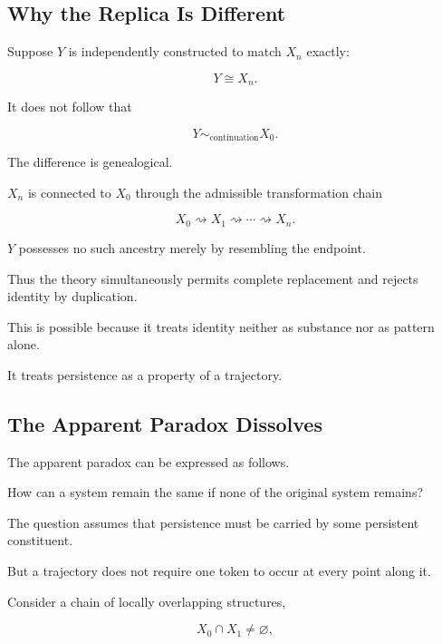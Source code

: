 \documentclass[11pt]{article}
\theoremstyle{remark}
\begin{document}
\subsection{Why the Replica Is Different}

Suppose $Y$ is independently constructed to match $X_n$ exactly:

\begin{equation}
Y\cong X_n.
\end{equation}

It does not follow that

\begin{equation}
Y\sim_{\mathrm{continuation}}X_0.
\end{equation}

The difference is genealogical.

$X_n$ is connected to $X_0$ through the admissible transformation chain

\begin{equation}
X_0
\rightsquigarrow
X_1
\rightsquigarrow
\cdots
\rightsquigarrow
X_n.
\end{equation}

$Y$ possesses no such ancestry merely by resembling the endpoint.

Thus the theory simultaneously permits complete replacement and rejects identity by duplication.

This is possible because it treats identity neither as substance nor as pattern alone.

It treats persistence as a property of a trajectory.

\subsection{The Apparent Paradox Dissolves}

The apparent paradox can be expressed as follows.

How can a system remain the same if none of the original system remains?

The question assumes that persistence must be carried by some persistent constituent.

But a trajectory does not require one token to occur at every point along it.

Consider a chain of locally overlapping structures,

\begin{equation}
X_0\cap X_1\neq\varnothing,
\end{equation}
\end{document}
